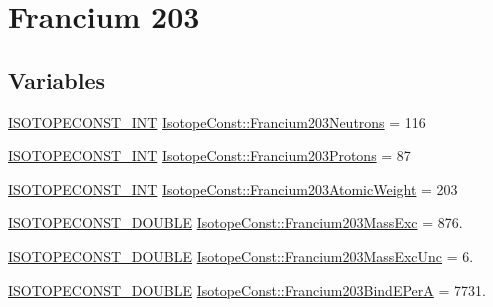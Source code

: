 \hypertarget{group___isotope_const-_francium-_fr203}{}\section{Francium 203}
\label{group___isotope_const-_francium-_fr203}
\subsection*{Variables}
\begin{DoxyCompactItemize}
\item 
\mbox{\hyperlink{group___isotope_const-_macros_ga5f18360b3e99483a35c32d789e62621c}{I\+S\+O\+T\+O\+P\+E\+C\+O\+N\+S\+T\+\_\+\+I\+NT}} \mbox{\hyperlink{group___isotope_const-_francium-_fr203_gad7ee8d098b88aaffd51dc0aad5d75004}{Isotope\+Const\+::\+Francium203\+Neutrons}} = 116
\item 
\mbox{\hyperlink{group___isotope_const-_macros_ga5f18360b3e99483a35c32d789e62621c}{I\+S\+O\+T\+O\+P\+E\+C\+O\+N\+S\+T\+\_\+\+I\+NT}} \mbox{\hyperlink{group___isotope_const-_francium-_fr203_ga3f84e7490e0f2cb846be58cbc1c5a825}{Isotope\+Const\+::\+Francium203\+Protons}} = 87
\item 
\mbox{\hyperlink{group___isotope_const-_macros_ga5f18360b3e99483a35c32d789e62621c}{I\+S\+O\+T\+O\+P\+E\+C\+O\+N\+S\+T\+\_\+\+I\+NT}} \mbox{\hyperlink{group___isotope_const-_francium-_fr203_ga1b4939f9e0bd0faef71e9590f3103c31}{Isotope\+Const\+::\+Francium203\+Atomic\+Weight}} = 203
\item 
\mbox{\hyperlink{group___isotope_const-_macros_ga8f45a7272ce02c0b4c65c44636ed719a}{I\+S\+O\+T\+O\+P\+E\+C\+O\+N\+S\+T\+\_\+\+D\+O\+U\+B\+LE}} \mbox{\hyperlink{group___isotope_const-_francium-_fr203_ga03426f40b825a8c1ce73a4ef76c8addf}{Isotope\+Const\+::\+Francium203\+Mass\+Exc}} = 876.
\item 
\mbox{\hyperlink{group___isotope_const-_macros_ga8f45a7272ce02c0b4c65c44636ed719a}{I\+S\+O\+T\+O\+P\+E\+C\+O\+N\+S\+T\+\_\+\+D\+O\+U\+B\+LE}} \mbox{\hyperlink{group___isotope_const-_francium-_fr203_ga011f709b187accc606aa162d5a340af9}{Isotope\+Const\+::\+Francium203\+Mass\+Exc\+Unc}} = 6.
\item 
\mbox{\hyperlink{group___isotope_const-_macros_ga8f45a7272ce02c0b4c65c44636ed719a}{I\+S\+O\+T\+O\+P\+E\+C\+O\+N\+S\+T\+\_\+\+D\+O\+U\+B\+LE}} \mbox{\hyperlink{group___isotope_const-_francium-_fr203_gaa6d9b51f1deb9b124f057533d9cc60e7}{Isotope\+Const\+::\+Francium203\+Bind\+E\+PerA}} = 7731.
\item 

\end{DoxyCompactItemize}
